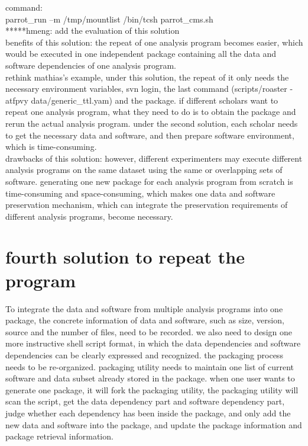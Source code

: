 \documentclass{article}
\begin{document}
command:\\
\indent parrot\_run –m /tmp/mountlist /bin/tcsh parrot\_cms.sh\\

*****hmeng: add the evaluation of this solution\\

benefits of this solution: the repeat of one analysis program becomes easier, which would be executed in one independent package containing all the data and software dependencies of one analysis program. \\

rethink mathias’s example, under this solution, the repeat of it only needs the necessary environment variables, svn login,  the last command (scripts/roaster -atfpvy data/generic\_ttl.yam) and the package. if different scholars want to repeat one analysis program, what they need to do is to obtain the package and rerun the actual analysis program. under the second solution, each scholar needs to get the necessary data and software, and then prepare software environment, which is time-consuming. \\

drawbacks of this solution: however, different experimenters may execute different analysis programs on the same dataset using the same or overlapping sets of software. generating one new package for each analysis program from scratch is time-consuming and space-consuming, which makes one data and software preservation mechanism, which can integrate the preservation requirements of different analysis programs, become necessary. 

\section{fourth solution to repeat the program}
\indent To integrate the data and software from multiple analysis programs into one package, the concrete information of data and software, such as size, version, source and the number of files, need to be recorded. we also need to design one more instructive shell script format, in which the data dependencies and software dependencies can be clearly expressed and recognized. the packaging process needs to be re-organized. packaging utility needs to maintain one list of current software and data subset already stored in the package. when one user wants to generate one package, it will fork the packaging utility, the packaging utility will scan the script, get the data dependency part and software dependency part, judge whether each dependency has been inside the package, and only add the new data and software into the package, and update the package information and package retrieval information.\\
\end{document}
